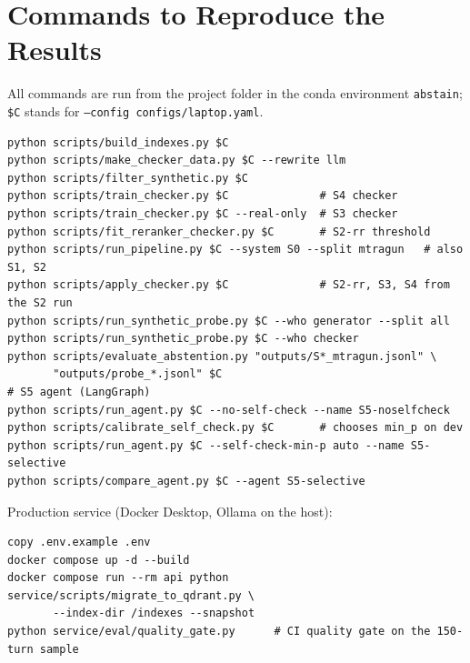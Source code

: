 \documentclass[11pt,a4paper]{report}
\begin{document}
\chapter{Commands to Reproduce the Results}
All commands are run from the project folder in the conda environment \texttt{abstain}; \texttt{\$C} stands for \texttt{--config configs/laptop.yaml}.
{\footnotesize
\begin{verbatim}
python scripts/build_indexes.py $C
python scripts/make_checker_data.py $C --rewrite llm
python scripts/filter_synthetic.py $C
python scripts/train_checker.py $C              # S4 checker
python scripts/train_checker.py $C --real-only  # S3 checker
python scripts/fit_reranker_checker.py $C       # S2-rr threshold
python scripts/run_pipeline.py $C --system S0 --split mtragun   # also S1, S2
python scripts/apply_checker.py $C              # S2-rr, S3, S4 from the S2 run
python scripts/run_synthetic_probe.py $C --who generator --split all
python scripts/run_synthetic_probe.py $C --who checker
python scripts/evaluate_abstention.py "outputs/S*_mtragun.jsonl" \
       "outputs/probe_*.jsonl" $C
# S5 agent (LangGraph)
python scripts/run_agent.py $C --no-self-check --name S5-noselfcheck
python scripts/calibrate_self_check.py $C       # chooses min_p on dev
python scripts/run_agent.py $C --self-check-min-p auto --name S5-selective
python scripts/compare_agent.py $C --agent S5-selective
\end{verbatim}}
Production service (Docker Desktop, Ollama on the host):
{\footnotesize
\begin{verbatim}
copy .env.example .env
docker compose up -d --build
docker compose run --rm api python service/scripts/migrate_to_qdrant.py \
       --index-dir /indexes --snapshot
python service/eval/quality_gate.py      # CI quality gate on the 150-turn sample
\end{verbatim}}
\end{document}
